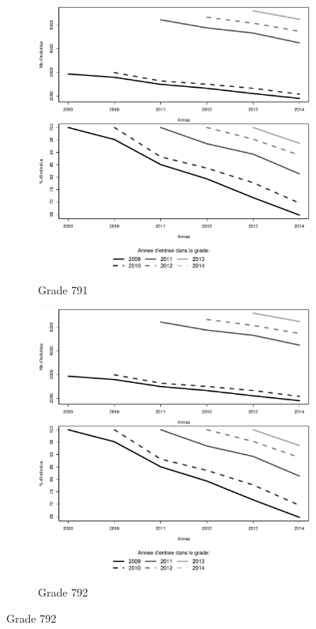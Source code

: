 \documentclass[11pt,a4paper]{article}
\begin{document}
\begin{figure}[ht] 
  \caption{Survie dans le grade: Adjoints administratifs}
  \label{surv_by_entry} 
  \begin{subfigure}[b]{0.5\linewidth}
      \caption{Grade 791} 
    \label{echelon_by_neg_0} 
    \centering
    \includegraphics[width=1\linewidth]{AA_survival_791.pdf} 
  \end{subfigure}%
  \begin{subfigure}[b]{0.5\linewidth}
        \caption{Grade 792} 
    \label{echelon_by_neg_1} 
    \centering
    \includegraphics[width=1\linewidth]{AA_survival_792.pdf} 
  \end{subfigure} 
\end{figure}
\end{document}
